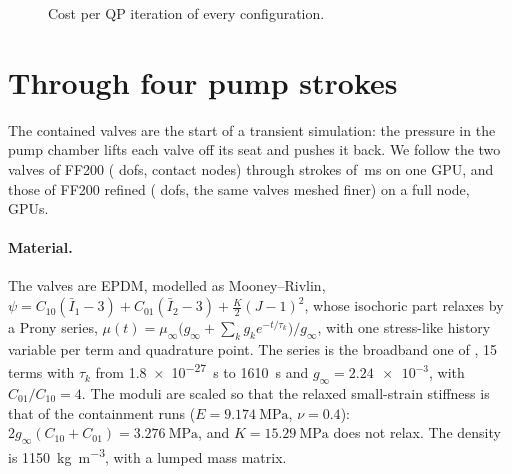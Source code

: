\documentclass[sigconf,nonacm]{acmart}
\begin{document}
\begin{table}
\caption{The overlap released over 1, 2 and 4 pseudo-steps, each solved to convergence, on
$4\times72$: Newton steps (those of failed attempts included) and solve time, median of
\releaseRepeats{} runs each, alternating per repeat.}
\label{tab:release}
\small

\end{table}

\begin{figure}
\centering

\caption{Cost per QP iteration of every configuration.}
\label{fig:per-iteration}
\end{figure}

\section{Through four pump strokes}
\label{sec:strokes}

The contained valves are the start of a transient simulation: the pressure in the pump chamber
lifts each valve off its seat and pushes it back. We follow the two valves of FF200
(\dofsFFc{} dofs, \trContactNodes{} contact nodes) through \trStrokes{} strokes of
\trStrokeMs\,\si{\milli\second} on one GPU, and those of FF200 refined (\dofsFFf{} dofs, the same
valves meshed finer) on a full node, \trGpusRefined{} GPUs.

\paragraph{Material.} The valves are EPDM, modelled as Mooney--Rivlin,
$\psi = C_{10}(\bar I_1-3) + C_{01}(\bar I_2-3) + \tfrac{K}{2}(J-1)^2$, whose isochoric part
relaxes by a Prony series, $\mu(t) = \mu_\infty\bigl(g_\infty + \sum_k g_k e^{-t/\tau_k}\bigr)/g_\infty$,
with one stress-like history variable per term and quadrature point. The series is the broadband one
of \citet{felhos2008}, 15 terms with $\tau_k$ from \SI{1.8e-27}{\second} to \SI{1610}{\second} and
$g_\infty = \num{2.24e-3}$, with $C_{01}/C_{10}=4$. The moduli are scaled so that the relaxed
small-strain stiffness is that of the containment runs ($E=\SI{9.174}{\mega\pascal}$, $\nu=0.4$):
$2g_\infty(C_{10}+C_{01}) = \SI{3.276}{\mega\pascal}$, and $K=\SI{15.29}{\mega\pascal}$ does not
relax. The density is \SI{1150}{\kilo\gram\per\cubic\metre}, with a lumped mass matrix.
\end{document}
